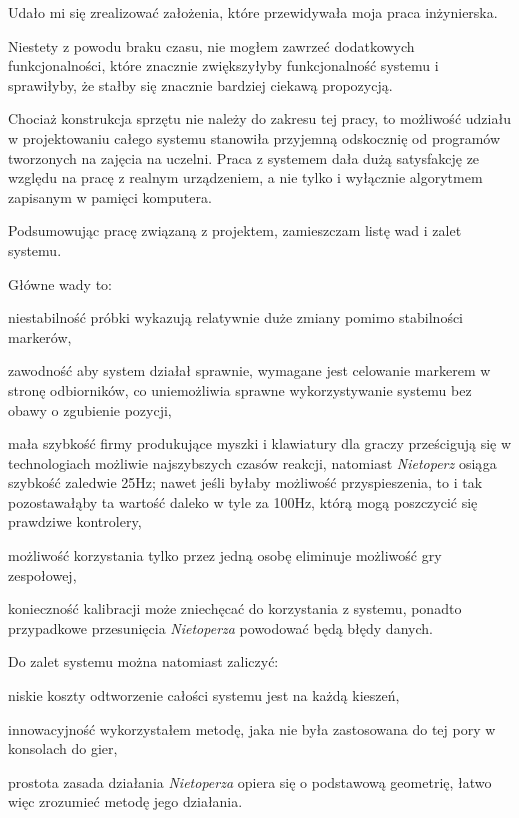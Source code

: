 \label{ch:conclusion}

Udało mi się zrealizować założenia, które przewidywała moja praca inżynierska.

Niestety z powodu braku czasu, nie mogłem zawrzeć dodatkowych funkcjonalności, które znacznie zwiększyłyby funkcjonalność systemu i sprawiłyby, że stałby się znacznie bardziej ciekawą propozycją.

Chociaż konstrukcja sprzętu nie należy do zakresu tej pracy, to możliwość udziału w projektowaniu całego systemu stanowiła przyjemną odskocznię od programów tworzonych na zajęcia na uczelni. Praca z systemem dała dużą satysfakcję ze względu na pracę z realnym urządzeniem, a nie tylko i wyłącznie algorytmem zapisanym w pamięci komputera.


Podsumowując pracę związaną z projektem, zamieszczam listę wad i zalet systemu.

Główne wady to:
\begin{aenumerate}
 \item niestabilność \ppauza próbki wykazują relatywnie duże zmiany pomimo stabilności markerów,
 \item zawodność \ppauza aby system działał sprawnie, wymagane jest celowanie markerem w stronę odbiorników, co uniemożliwia sprawne wykorzystywanie systemu bez obawy o zgubienie pozycji,
 \item mała szybkość \ppauza firmy produkujące myszki i klawiatury dla graczy prześcigują się w technologiach możliwie najszybszych czasów reakcji, natomiast \textsl{Nietoperz} osiąga szybkość zaledwie 25Hz; nawet jeśli byłaby możliwość przyspieszenia, to i tak pozostawałąby ta wartość daleko w tyle za 100Hz, którą mogą poszczycić się prawdziwe kontrolery,
 \item możliwość korzystania tylko przez jedną osobę \ppauza eliminuje możliwość gry zespołowej,
 \item konieczność kalibracji \ppauza może zniechęcać do korzystania z systemu, ponadto przypadkowe przesunięcia \textsl{Nietoperza} powodować będą błędy danych.
\end{aenumerate}

Do zalet systemu można natomiast zaliczyć:
\begin{aenumerate}
 \item niskie koszty \ppauza odtworzenie całości systemu jest na każdą kieszeń,
 \item innowacyjność \ppauza wykorzystałem metodę, jaka nie była zastosowana do tej pory w konsolach do gier,
 \item prostota \ppauza zasada działania \textsl{Nietoperza} opiera się o podstawową geometrię, łatwo więc zrozumieć metodę jego działania.
\end{aenumerate}

